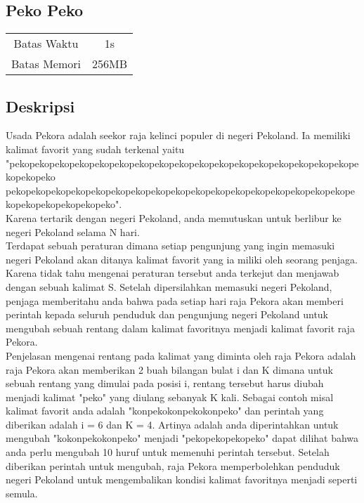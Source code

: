 \documentclass{article}
\begin{document}
\begin{center}

    
    \section*{Peko Peko} %

    \begin{tabular}{ | c c | }
        \hline
        Batas Waktu  & 1s \\    %
        Batas Memori & 256MB \\  %
        \hline
    \end{tabular}
\end{center}

\subsection*{Deskripsi}

Usada Pekora adalah seekor raja kelinci populer di negeri Pekoland. Ia memiliki kalimat favorit yang sudah terkenal yaitu "pekopekopekopekopekopekopekopekopekopekopekopekopekopekopekopekopekopekopekopeko \\ 
pekopekopekopekopekopekopekopekopekopekopekopekopekopekopekopekopekopekopekopekopekopekopeko". \\
Karena tertarik dengan negeri Pekoland, anda memutuskan untuk berlibur ke negeri Pekoland selama N hari. \\

Terdapat sebuah peraturan dimana setiap pengunjung yang ingin memasuki negeri Pekoland akan ditanya kalimat favorit yang ia miliki oleh seorang penjaga. Karena tidak tahu mengenai peraturan tersebut anda terkejut dan menjawab dengan sebuah kalimat S. Setelah dipersilahkan memasuki negeri Pekoland, penjaga memberitahu anda bahwa pada setiap hari raja Pekora akan memberi perintah kepada seluruh penduduk dan pengunjung negeri Pekoland untuk mengubah sebuah rentang dalam kalimat favoritnya menjadi kalimat favorit raja Pekora.\\

Penjelasan mengenai rentang pada kalimat yang diminta oleh raja Pekora adalah raja Pekora akan memberikan 2 buah bilangan bulat i dan K dimana untuk sebuah rentang yang dimulai pada posisi i, rentang tersebut harus diubah menjadi kalimat "peko" yang diulang sebanyak K kali. Sebagai contoh misal kalimat favorit anda adalah "konpekokonpekokonpeko" dan perintah yang diberikan adalah i = 6 dan K = 4. Artinya adalah anda diperintahkan untuk mengubah "kokonpekokonpeko" menjadi "pekopekopekopeko" dapat dilihat bahwa anda perlu mengubah 10 huruf untuk memenuhi perintah tersebut. Setelah diberikan perintah untuk mengubah, raja Pekora memperbolehkan penduduk negeri Pekoland untuk mengembalikan kondisi kalimat favoritnya menjadi seperti semula.\\
\end{document}
